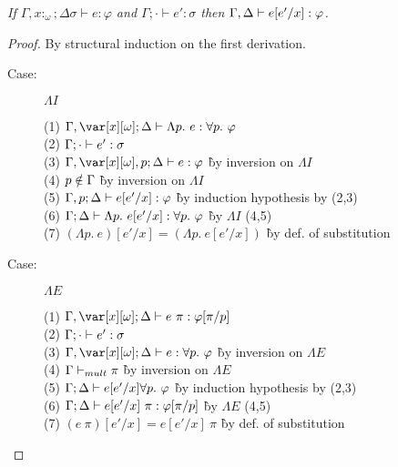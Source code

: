 

\begin{lemma}
\emph{If $\Gamma, x{:}_\omega; \Delta \sigma \vdash e : \varphi$ and $\Gamma; \cdot \vdash e' : \sigma$ then $\Gamma,\Delta \vdash e[e'/x] : \varphi$.}
\end{lemma}

\begin{proof}
By structural induction on the first derivation.

\begin{description}

\item[Case:] $\Lambda I$
\begin{tabbing}
  (1) $\G, \xo; \D \vdash \Lambda p.~e : \forall p.~\varphi$\\
  (2) $\Gamma; \cdot \vdash e' : \sigma$ \\
  (3) $\G, \xo, p; \D \vdash e : \varphi$ \` by inversion on $\Lambda I$\\
  (4) $p \notin \Gamma$ \` by inversion on $\Lambda I$\\
  (5) $\Gamma, p; \Delta \vdash e[e'/x] : \varphi$ \` by induction hypothesis by (2,3)\\
  (6) $\Gamma; \Delta \vdash \Lambda p.~e[e'/x] : \forall p.~\varphi$ \` by $\Lambda I$ (4,5)\\
  (7) $(\Lambda p.~e)[e'/x] = (\Lambda p.~e[e'/x])$ \` by def. of substitution\\
\end{tabbing}

\item[Case:] $\Lambda E$
\begin{tabbing}
  (1) $\G, \xo; \D \vdash e~\pi: \varphi[\pi/p]$\\
  (2) $\Gamma; \cdot \vdash e' : \sigma$\\
  (3) $\G, \xo; \D \vdash e : \forall p.~\varphi$ \` by inversion on $\Lambda E$\\
  (4) $\Gamma \vdash_{mult} \pi$ \` by inversion on $\Lambda E$\\
  (5) $\Gamma; \Delta \vdash e[e'/x] \forall p.~\varphi$ \` by induction hypothesis by (2,3)\\
  (6) $\Gamma; \Delta \vdash e[e'/x]~\pi : \varphi[\pi/p]$ \` by $\Lambda E$ (4,5)\\
  (7) $(e~\pi)[e'/x] = e[e'/x]~\pi$ \` by def. of substitution\\
\end{tabbing}


\end{description}
\end{proof}

